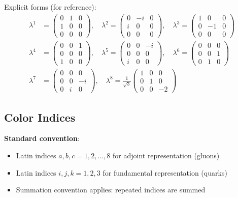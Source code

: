 Explicit forms (for reference):
\begin{align}
\lambda^1 &= \begin{pmatrix} 0 & 1 & 0 \\ 1 & 0 & 0 \\ 0 & 0 & 0 \end{pmatrix}, \quad
\lambda^2 = \begin{pmatrix} 0 & -i & 0 \\ i & 0 & 0 \\ 0 & 0 & 0 \end{pmatrix}, \quad
\lambda^3 = \begin{pmatrix} 1 & 0 & 0 \\ 0 & -1 & 0 \\ 0 & 0 & 0 \end{pmatrix} \\
\lambda^4 &= \begin{pmatrix} 0 & 0 & 1 \\ 0 & 0 & 0 \\ 1 & 0 & 0 \end{pmatrix}, \quad
\lambda^5 = \begin{pmatrix} 0 & 0 & -i \\ 0 & 0 & 0 \\ i & 0 & 0 \end{pmatrix}, \quad
\lambda^6 = \begin{pmatrix} 0 & 0 & 0 \\ 0 & 0 & 1 \\ 0 & 1 & 0 \end{pmatrix} \\
\lambda^7 &= \begin{pmatrix} 0 & 0 & 0 \\ 0 & 0 & -i \\ 0 & i & 0 \end{pmatrix}, \quad
\lambda^8 = \frac{1}{\sqrt{3}}\begin{pmatrix} 1 & 0 & 0 \\ 0 & 1 & 0 \\ 0 & 0 & -2 \end{pmatrix}
\end{align}

\subsection{Color Indices}

\textbf{Standard convention}:
\begin{itemize}
    \item Latin indices $a, b, c = 1, 2, \ldots, 8$ for adjoint representation (gluons)
    \item Latin indices $i, j, k = 1, 2, 3$ for fundamental representation (quarks)
    \item Summation convention applies: repeated indices are summed
\end{itemize}

